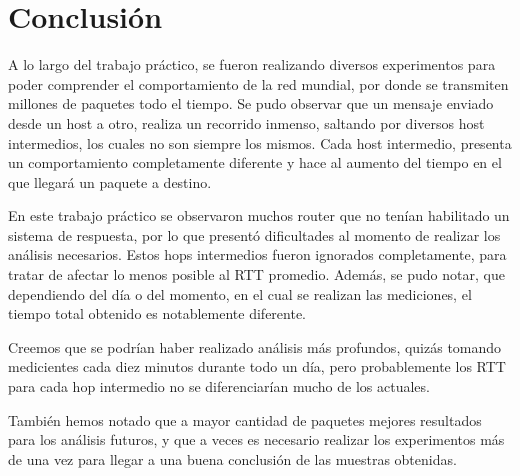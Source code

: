 \section{Conclusión}

A lo largo del trabajo práctico, se fueron realizando diversos experimentos para poder comprender el comportamiento de la red mundial, por 
donde se transmiten millones de paquetes todo el tiempo. Se pudo observar que un mensaje enviado desde un host a otro, realiza 
un recorrido inmenso, saltando por diversos host intermedios, los cuales no son siempre los mismos. Cada host intermedio, presenta un comportamiento completamente diferente y hace al aumento del tiempo en el que llegará un paquete a destino. 

En este trabajo práctico se observaron muchos router que no tenían habilitado un sistema de respuesta, por lo que presentó dificultades al momento de realizar los análisis necesarios. Estos hops intermedios fueron ignorados completamente, para tratar de afectar lo menos posible al RTT promedio. Además, se pudo notar, que dependiendo del día o del momento, en el cual se realizan las mediciones, el tiempo total obtenido es notablemente diferente. 

Creemos que se podrían haber realizado análisis más profundos, quizás tomando medicientes cada diez 
minutos durante todo un día, pero probablemente los RTT para cada hop intermedio no se diferenciarían mucho de los actuales. 

También hemos notado que a mayor cantidad de paquetes mejores resultados para los análisis futuros, y que a veces es necesario realizar 
los experimentos más de una vez para llegar a una buena conclusión de las muestras obtenidas.